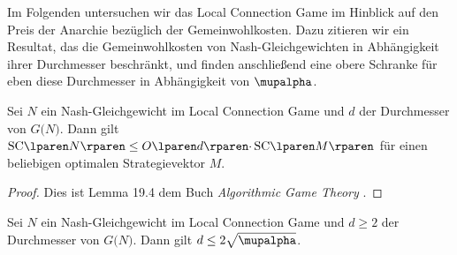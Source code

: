 \bigskip

Im Folgenden untersuchen wir das Local Connection Game
im Hinblick auf den Preis der Anarchie bezüglich der Gemeinwohlkosten.
Dazu zitieren wir ein Resultat,
das die Gemeinwohlkosten von Nash-Gleichgewichten
in Abhängigkeit ihrer Durchmesser beschränkt,
und finden anschließend eine obere Schranke für eben diese Durchmesser
in Abhängigkeit von $\mupalpha$.

\begin{lemma}
  \label{la:local_durchmesser1}
  Sei $N$ ein Nash-Gleichgewicht im Local Connection Game
  und $d$ der Durchmesser von $G \lparen N \rparen$.
  Dann gilt $\SC{N} \leq O \lparen d \rparen \cdotp \SC{M}$
  für einen beliebigen optimalen Strategievektor $M$.
\end{lemma}

\begin{proof}
  Dies ist Lemma 19.4 dem Buch \emph{Algorithmic Game Theory}
  \cite[S.~491f]{tardos_wexler_2007}.
\end{proof}

\begin{lemma}
\label{la:local_durchmesser2}
  Sei $N$ ein Nash-Gleichgewicht im Local Connection Game
  und $d \geq 2$ der Durchmesser von $G \lparen N \rparen$.
  Dann gilt $d \leq 2 \sqrt{\mupalpha}$.
\end{lemma}

